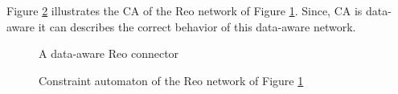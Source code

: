 \begin{BehExample}
\label{ex:contextsendo}
Figure \ref{fig:cadofilter} illustrates the CA of the Reo network of  
Figure \ref{fig:dofilters}. Since, CA is data-aware it can describes the correct behavior of this data-aware network.


   \begin{figure}[!h]
   \centering
{\mesaldofilter}
  \caption{A data-aware Reo connector}
    \label{fig:dofilters}
   \end{figure}      

\begin{figure}[!h]
\centering
    \caption[CA of Figure \ref{fig:dofilters}]{Constraint automaton of the Reo network of Figure \ref{fig:dofilters}}
\label{fig:cadofilter}
\end{figure}


\end{BehExample}

